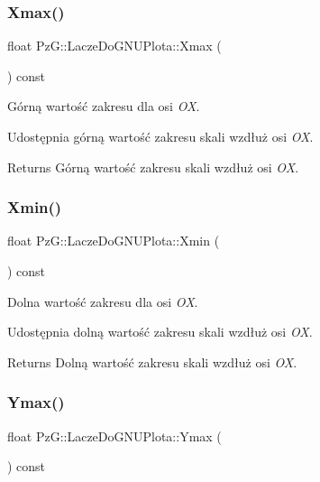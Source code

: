 \subsubsection{\texorpdfstring{Xmax()}{Xmax()}}
{\footnotesize\ttfamily float Pz\+G\+::\+Lacze\+Do\+G\+N\+U\+Plota\+::\+Xmax (\begin{DoxyParamCaption}{ }\end{DoxyParamCaption}) const\hspace{0.3cm}{\ttfamily [inline]}}



Górną wartość zakresu dla osi {\itshape OX}. 

Udostępnia górną wartość zakresu skali wzdłuż osi {\itshape OX}. \begin{DoxyReturn}{Returns}
Górną wartość zakresu skali wzdłuż osi {\itshape OX}. 
\end{DoxyReturn}
\mbox{\label{class_pz_g_1_1_lacze_do_g_n_u_plota_a66836c9749bf179420e4ca3e9447efd7}} 
\subsubsection{\texorpdfstring{Xmin()}{Xmin()}}
{\footnotesize\ttfamily float Pz\+G\+::\+Lacze\+Do\+G\+N\+U\+Plota\+::\+Xmin (\begin{DoxyParamCaption}{ }\end{DoxyParamCaption}) const\hspace{0.3cm}{\ttfamily [inline]}}



Dolna wartość zakresu dla osi {\itshape OX}. 

Udostępnia dolną wartość zakresu skali wzdłuż osi {\itshape OX}. \begin{DoxyReturn}{Returns}
Dolną wartość zakresu skali wzdłuż osi {\itshape OX}. 
\end{DoxyReturn}
\mbox{\label{class_pz_g_1_1_lacze_do_g_n_u_plota_ac54e4e7448ce3bd324efdc94a999f535}} 
\subsubsection{\texorpdfstring{Ymax()}{Ymax()}}
{\footnotesize\ttfamily float Pz\+G\+::\+Lacze\+Do\+G\+N\+U\+Plota\+::\+Ymax (\begin{DoxyParamCaption}{ }\end{DoxyParamCaption}) const\hspace{0.3cm}{\ttfamily [inline]}}



